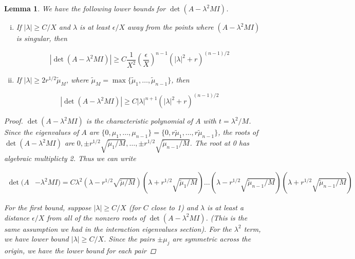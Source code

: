 \documentclass[12pt]{article}
\newtheorem{lemma}{Lemma}
\begin{document}
\begin{lemma}\label{detAboundlemma}
We have the following lower bounds for $\det(A - \lambda^2 M I)$.
\begin{enumerate}[(i)]
\item If $|\lambda| \geq C/X$ and $\lambda$ is at least $\epsilon/X$ away from the points where $(A - \lambda^2 MI)$ is singular, then

\begin{equation}\label{detAbound1}
|\det(A - \lambda^2 M I)|
\geq C \frac{1}{X^2} \left( \frac{\epsilon}{X} \right)^{n-1} \left( |\lambda|^2 + r \right)^{(n-1)/2}
\end{equation}

\item If $|\lambda| \geq 2 r^{1/2} \tilde{\mu}_M$, where $\tilde{\mu}_M = \max\{\tilde{\mu}_1, \dots, \tilde{\mu}_{n-1} \}$, then

\begin{equation}\label{detAbound2}
|\det(A - \lambda^2 M I)|
\geq C |\lambda|^{n+1} \left( |\lambda|^2 + r \right)^{(n-1)/2}
\end{equation}

\end{enumerate}

\begin{proof}
$\det(A - \lambda^2 MI)$ is the characteristic polynomial of $A$ with $t = \lambda^2 / M$. Since the eigenvalues of $A$ are $\{0, \mu_1, \dots, \mu_{n-1}\} = \{0, r \tilde{\mu}_1, \dots, r\tilde{\mu}_{n-1}\}$, the roots of $\det(A - \lambda^2 MI)$ are $0, \pm r^{1/2} \sqrt{\tilde{\mu}_1/M}, \dots, \pm r^{1/2} \sqrt{\tilde{\mu}_{n-1}/M}$. The root at 0 has algebraic multiplicty 2. Thus we can write

\begin{align*}
\det(A &- \lambda^2 M I) 
= C \lambda^2 (\lambda - r^{1/2} \sqrt{\tilde{\mu}/M} )(\lambda + r^{1/2} \sqrt{\tilde{\mu}_1/M} )
\dots(\lambda - r^{1/2} \sqrt{\tilde{\mu}_{n-1}/M})(\lambda + r^{1/2} \sqrt{\tilde{\mu}_{n-1}/M} )
\end{align*}

For the first bound, suppose $|\lambda| \geq C/X$ (for $C$ close to 1) and $\lambda$ is at least a distance $\epsilon/X$ from all of the nonzero roots of $\det(A - \lambda^2 MI)$. (This is the same assumption we had in the interaction eigenvalues section). For the $\lambda^2$ term, we have lower bound $|\lambda| \geq C/X$. Since the pairs $\pm \mu_j$ are symmetric across the origin, we have the lower bound for each pair


\end{proof}
\end{lemma}
\end{document}
